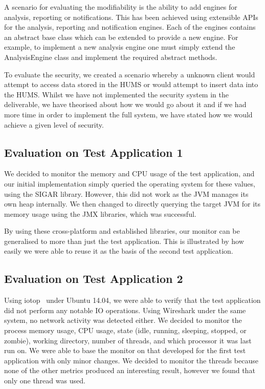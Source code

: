 \documentclass[10pt,a4paper]{article}
\begin{document}
A scenario for evaluating the modifiability is the ability to add engines for analysis, reporting or notifications. This has been achieved using extensible APIs for the analysis, reporting and notification engines. Each of the engines contains an abstract base class which can be extended to provide a new engine. For example, to implement a new analysis engine one must simply extend the AnalysisEngine class and implement the required abstract methods.

To evaluate the security, we created a scenario whereby a unknown client would attempt to access data stored in the HUMS or would attempt to insert data into the HUMS. Whilst we have not implemented the security system in the deliverable, we have theorised about how we would go about it and if we had more time in order to implement the full system, we have stated how we would achieve a given level of security.

\subsection{Evaluation on Test Application 1}
\label{sec:test_app1}

We decided to monitor the memory and CPU usage of the test application, and our initial implementation simply queried the operating system for these values, using the SIGAR library. However, this did not work as the JVM manages its own heap internally. We then changed to directly querying the target JVM for its memory usage using the JMX libraries, which was successful.

By using these cross-platform and established libraries, our monitor can be generalised to more than just the test application. This is illustrated by how easily we were able to reuse it as the basis of the second test application.

\subsection{Evaluation on Test Application 2}
\label{sec:test_app2}

Using iotop~\cite{iotop} under Ubuntu 14.04, we were able to verify that the test application did not perform any notable IO operations. Using Wireshark under the same system, no network activity was detected either.
We decided to monitor the process memory usage, CPU usage, state (idle, running, sleeping, stopped, or zombie), working directory, number of threads, and which processor it was last run on. We were able to base the monitor on that developed for the first test application with only minor changes. We decided to monitor the threads because none of the other metrics produced an interesting result, however we found that only one thread was used.
\end{document}
